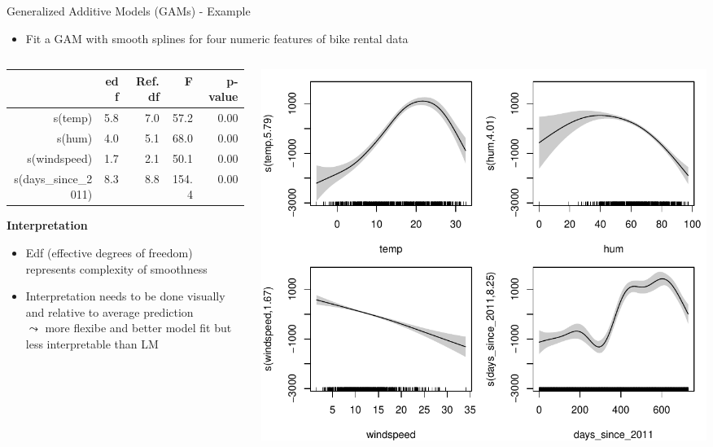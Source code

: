 \documentclass[11pt,compress,t,notes=noshow, aspectratio=169, xcolor=table]{beamer}
\begin{document}
\begin{frame}{Generalized Additive Models (GAMs) - Example}
    \begin{itemize}
    \item Fit a GAM with smooth splines for four numeric features of bike rental data 
\end{itemize}

\begin{columns}[T]
\begin{column}{0.45\textwidth}
\begin{table}[ht]
\centering
\tiny
\begin{tabular}{rrrrr}
  \hline
 & edf & Ref.df & F & p-value \\ 
  \hline
s(temp) & 5.8 & 7.0 & 57.2 & 0.00 \\ 
  s(hum) & 4.0 & 5.1 & 68.0 & 0.00 \\ 
  s(windspeed) & 1.7 & 2.1 & 50.1 & 0.00 \\ 
  s(days\_since\_2011) & 8.3 & 8.8 & 154.4 & 0.00 \\ 
   \hline
\end{tabular}
\end{table}


\textbf{Interpretation}
\begin{itemize}
    \item Edf (effective degrees of freedom) represents complexity of smoothness
    \item Interpretation needs to be done visually and relative to average prediction\\
    $\leadsto$ more flexibe and better model fit but less interpretable than LM
\end{itemize}
\end{column}
\hfill
\begin{column}{0.5\textwidth}
\includegraphics[width = \textwidth]{figure/gam_effects.pdf}
\end{column}
\end{columns}
\end{frame}
\end{document}
